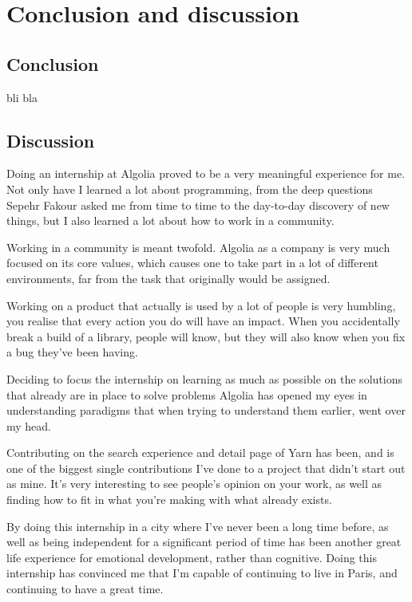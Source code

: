 
\chapter{Conclusion and discussion} %
\label{chp:conclusion}

\section{Conclusion}

bli bla %

\section{Discussion}

Doing an internship at Algolia proved to be a very meaningful experience for me. Not only have I learned a lot about programming, from the deep questions Sepehr Fakour asked me from time to time to the day-to-day discovery of new things, but I also learned a lot about how to work in a community.

Working in a community is meant twofold. Algolia as a company is very much focused on its core values, which causes one to take part in a lot of different environments, far from the task that originally would be assigned.

Working on a product that actually is used by a lot of people is very humbling, you realise that every action you do will have an impact. When you accidentally break a build of a library, people will know, but they will also know when you fix a bug they've been having.

Deciding to focus the internship on learning as much as possible on the solutions that already are in place to solve problems Algolia has opened my eyes in understanding paradigms that when trying to understand them earlier, went over my head.

Contributing on the search experience and detail page of Yarn has been, and is one of the biggest single contributions I've done to a project that didn't start out as mine. It's very interesting to see people's opinion on your work, as well as finding how to fit in what you're making with what already exists.

By doing this internship in a city where I've never been a long time before, as well as being independent for a significant period of time has been another great life experience for emotional development, rather than cognitive. Doing this internship has convinced me that I'm capable of continuing to live in Paris, and continuing to have a great time.
